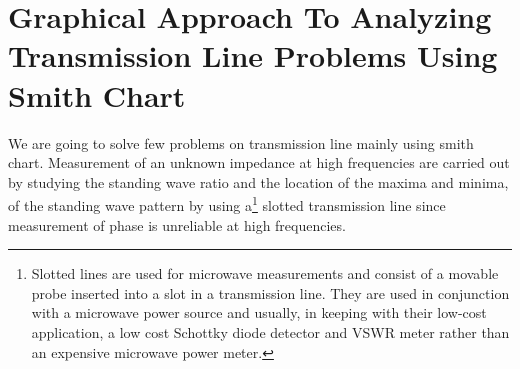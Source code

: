 \chapter{Graphical Approach To Analyzing Transmission Line Problems Using Smith Chart}\label{lec:lec15}
We are going to solve few problems on transmission line mainly using smith chart. Measurement of an unknown impedance at high frequencies are carried out by studying the standing wave ratio and the location of the maxima and minima, of the standing wave pattern by using a\footnote{Slotted lines are used for microwave measurements and consist of a movable probe inserted into a slot in a transmission line. They are used in conjunction with a microwave power source and usually, in keeping with their low-cost application, a low cost Schottky diode detector and VSWR meter rather than an expensive microwave power meter.} slotted transmission line since measurement of phase is unreliable at high frequencies.

